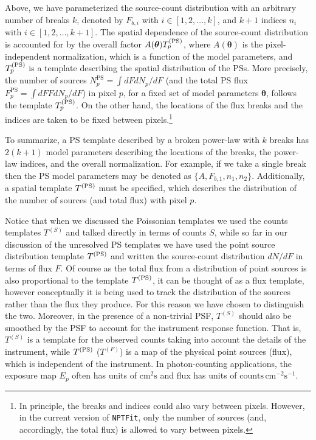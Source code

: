 Above, we have parameterized the source-count distribution with an arbitrary number of breaks $k$, denoted by $F_{b,i}$ with \mbox{$i \in [1,2, \ldots, k]$}, and $k+1$ indices $n_i$ with \mbox{$i \in [1,2, \ldots , k+1]$}.  The spatial dependence of the source-count distribution is accounted for by the overall factor $A ( {\bm \theta}) T_p^{({\rm PS})}$, where $A ( {\bm \theta})$ is the pixel-independent normalization, which is a function of the model parameters, and $T_p^{({\rm PS})}$ is a template describing the spatial distribution of the PSs.  More precisely, the number of sources $N^\text{PS}_p = \int dF dN_p / dF$ (and the total PS flux $F^\text{PS}_p = \int dF F dN_p / dF$) in pixel $p$, for a fixed set of model parameters ${\bm \theta}$, follows the template $T_p^{({\rm PS})}$.  On the other hand, the locations of the flux breaks and the indices are taken to be fixed between pixels.\footnote{In principle, the breaks and indices could also vary between pixels.  However, in the current version of \texttt{NPTFit}, only the number of sources (and, accordingly, the total flux) is allowed to vary between pixels.} 

To summarize, a PS template described by a broken power-law with $k$ breaks has $2 (k+1)$ model parameters describing the locations of the breaks, the power-law indices, and the overall normalization.  For example, if we take a single break then the PS model parameters may be denoted as $\{ A, F_{b,1}, n_1, n_2 \}$.  Additionally, a spatial template $T^{({\rm PS})}$ must be specified, which describes the distribution of the number of sources (and total flux) with pixel $p$.     

Notice that when we discussed the Poissonian templates we used the counts templates $T^{(S)}$ and talked directly in terms of counts $S$, while so far in our discussion of the unresolved PS templates we have used the point source distribution template $T^{({\rm PS})}$ and written the source-count distribution $dN/dF$ in terms of flux $F$. Of course as the total flux from a distribution of point sources is also proportional to the template $T^{({\rm PS})}$, it can be thought of as a flux template, however conceptually it is being used to track the distribution of the sources rather than the flux they produce. For this reason we have chosen to distinguish the two. Moreover, in the presence of a non-trivial PSF, $T^{(S)}$ should also be smoothed by the PSF to account for the instrument response function.  That is, $T^{(S)}$ is a template for the observed counts taking into account the details of the instrument, while $T^{({\rm PS})}$ ($T^{(F)}$) is a map of the physical point sources (flux), which is independent of the instrument.  In photon-counting applications, the exposure map $E_p$ often has units of $\text{cm}^2 \text{s}$ and flux has units of $\text{counts}\, \text{cm}^{-2}\text{s}^{-1}$.

